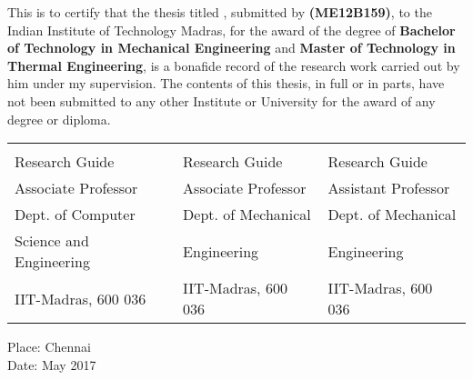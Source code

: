 \certificate
\vspace*{0.5in}
\noindent This is to certify that the thesis titled {\bf {\thesistitle}}, 
submitted by {\bf {\thesisauthor}} \textbf{(ME12B159)}, to the Indian Institute of Technology Madras, for the award of the degree of {\bf Bachelor of Technology in Mechanical Engineering} and {\bf Master of Technology in Thermal Engineering}, 
is a bonafide record of the research work carried out by him under my
supervision. The contents of this thesis, in full or in parts, have not been
submitted to any other Institute or University for the award of any degree or diploma.

\vspace*{1.4in}
\hspace*{-0.25in}
\begin{tabular}{ @{}l l l }
 \noindent{\bf Prof.~Balaraman~Ravindran} & 
 \noindent{\bf Prof.~Prabhu~Rajagopal} & 
 \noindent{\bf Prof.~Srikrishna~Sahu}
 \vspace*{-0.1578in} \\

 Research Guide & 
 \noindent Research Guide & 
 \noindent Research Guide
 \vspace*{-0.1578in} \\

 Associate Professor & 
 \noindent Associate Professor & 
 \noindent Assistant Professor
 \vspace*{-0.1578in} \\
 
 Dept. of Computer & 
 \noindent Dept. of Mechanical & 
 \noindent Dept. of Mechanical
 \vspace*{-0.1578in} \\
 
 Science and Engineering & 
 \noindent Engineering & 
 \noindent Engineering
 \vspace*{-0.1578in} \\
 
 IIT-Madras, 600 036 & 
 \noindent IIT-Madras, 600 036 & 
 \noindent IIT-Madras, 600 036
 \vspace*{-0.1578in}
 
\end{tabular}

\vspace*{0.7in}
\noindent Place: Chennai\\ 
Date: May 2017 
